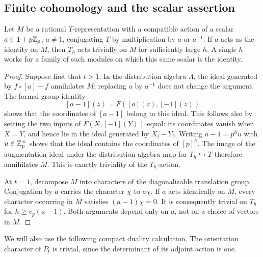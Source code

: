 \subsection{Finite cohomology and the scalar assertion}

\begin{lemma}
\label{full:scalar-translation}
Let $M$ be a rational $T$-representation with a compatible action of a
scalar $a\in1+p\mathbb Z_p$, $a\ne1$, conjugating $T$ by multiplication by
$a$ or $a^{-1}$.  If $a$ acts as the identity on $M$, then $T_h$ acts
trivially on $M$ for sufficiently large $h$.  A single $h$ works for a
family of such modules on which this same scalar is the identity.
\end{lemma}

\begin{proof}
Suppose first that $t>1$.  In the distribution algebra $\Lambda$, the
ideal generated by $f\circ[a]-f$ annihilates $M$; replacing $a$ by
$a^{-1}$ does not change the argument.  The formal group identity
\[
 [a-1](z)=F([a](z),[-1](z))
\]
shows that the coordinates of $[a-1]$ belong to this ideal.  This follows
also by setting the two inputs of $F(X,[-1](Y))$ equal: its coordinates
vanish when $X=Y$, and hence lie in the ideal generated by $X_i-Y_i$.
Writing $a-1=p^h u$ with $u\in\mathbb Z_p^\times$ shows that the ideal contains
the coordinates of $[p]^h$.  The image of the augmentation ideal under
the distribution-algebra map for $T_h\hookrightarrow T$ therefore
annihilates $M$.  This is exactly triviality of the $T_h$-action.

At $t=1$, decompose $M$ into characters of the diagonalizable
translation group.  Conjugation by $a$ carries the character $\chi$ to
$a\chi$.  If $a$ acts identically on $M$, every character occurring in
$M$ satisfies $(a-1)\chi=0$.  It is consequently trivial on $T_h$ for
$h\geq v_p(a-1)$.  Both arguments depend only on $a$, not on a choice
of vectors in $M$.
\end{proof}

We will also use the following compact duality calculation.  The
orientation character of $P_t$ is trivial, since the determinant of its
adjoint action is one.

